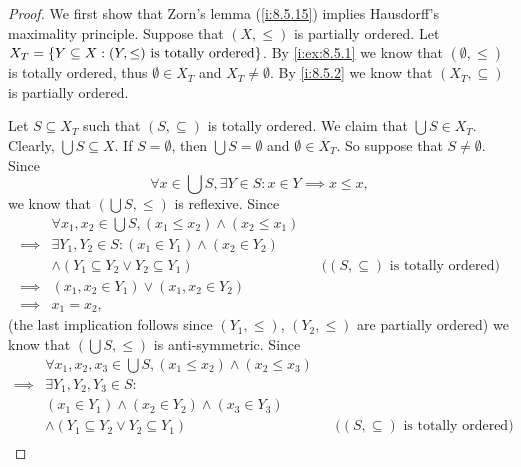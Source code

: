 \begin{proof}
  We first show that Zorn's lemma (\cref{i:8.5.15}) implies Hausdorff's maximality principle.
  Suppose that \((X, \leq)\) is partially ordered.
  Let \(X_T = \left\lbrace Y \subseteq X : (Y, \leq) \text{ is totally ordered}\right\rbrace\).
  By \cref{i:ex:8.5.1} we know that \((\emptyset, \leq)\) is totally ordered, thus \(\emptyset \in X_T\) and \(X_T \neq \emptyset\).
  By \cref{i:8.5.2} we know that \((X_T, \subseteq)\) is partially ordered.

  Let \(S \subseteq X_T\) such that \((S, \subseteq)\) is totally ordered.
  We claim that \(\bigcup S \in X_T\).
  Clearly, \(\bigcup S \subseteq X\).
  If \(S = \emptyset\), then \(\bigcup S = \emptyset\) and \(\emptyset \in X_T\).
  So suppose that \(S \neq \emptyset\).
  Since
  \[
    \forall x \in \bigcup S, \exists Y \in S : x \in Y \implies x \leq x,
  \]
  we know that \((\bigcup S, \leq)\) is reflexive.
  Since
  \begin{align*}
             & \forall x_1, x_2 \in \bigcup S, (x_1 \leq x_2) \land (x_2 \leq x_1)                                                     \\
    \implies & \exists Y_1, Y_2 \in S : (x_1 \in Y_1) \land (x_2 \in Y_2)                                                              \\
             & \land (Y_1 \subseteq Y_2 \lor Y_2 \subseteq Y_1)                    &  & \text{(\((S, \subseteq)\) is totally ordered)} \\
    \implies & (x_1, x_2 \in Y_1) \lor (x_1, x_2 \in Y_2)                                                                              \\
    \implies & x_1 = x_2,
  \end{align*}
  (the last implication follows since \((Y_1, \leq)\), \((Y_2, \leq)\) are partially ordered)
  we know that \((\bigcup S, \leq)\) is anti-symmetric.
  Since
  \begin{align*}
             & \forall x_1, x_2, x_3 \in \bigcup S, (x_1 \leq x_2) \land (x_2 \leq x_3)                                                              \\
    \implies & \exists Y_1, Y_2, Y_3 \in S :                                                                                                         \\
             & (x_1 \in Y_1) \land (x_2 \in Y_2) \land (x_3 \in Y_3)                                                                                 \\
             & \land (Y_1 \subseteq Y_2 \lor Y_2 \subseteq Y_1)                                  &  & \text{(\((S, \subseteq)\) is totally ordered)} \\

\end{align*}
\end{proof}
